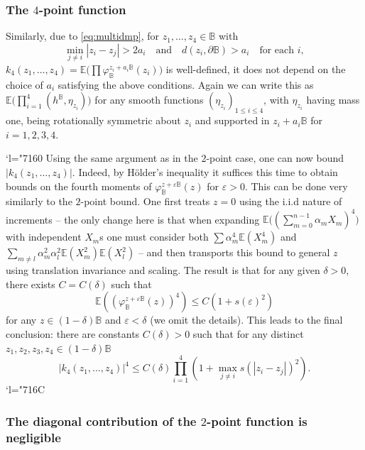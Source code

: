 \documentclass[10pt]{amsart}
\newcommand{\Changel}{\mathcode`l="7160}
\newcommand{\Changelback}{\mathcode`l="716C}
\theoremstyle{definition}
\newcommand{\E}{\mathbb{E}}
\newcommand{\B}{\mathbb{B}}\let\D\B\let\Ub\B
\let\eps\varepsilon
\begin{document}
\subsubsection*{The $4$-point function}
Similarly, due to \eqref{eq:multidmp}, for $z_1,\dots, z_4\in \B$ with
\[
\min_{j\ne i}{|z_i-z_j|}>2a_i\quad\text{and}\quad d(z_i,\partial \B)>a_i\quad\text{for each $i$},
\]
$k_4(z_1,\dots, z_4)=\E\bigl(\prod \varphi_\B^{z_i+a_i\B}(z_i)\bigr)$ is well-defined, \ie it does not depend on the choice of $a_i$ satisfying the above conditions. Again we can write this as $\E\bigl(\prod_{i=1}^4(h^\B,\eta_{z_i})\bigr)$ for any smooth functions $(\eta_{z_i})_{1\le i \le 4}$, with $\eta_{z_i}$ having mass one, being rotationally symmetric about $z_i$ and supported in $z_i+a_i\B$ for $i=1,2,3,4$.

\Changel
Using the same argument as in the $2$-point case, one can now bound $|k_4(z_1, \dots, z_4)|$. Indeed, by Hölder's inequality it suffices this time to obtain bounds on the fourth moments of $\varphi_\B^{z+\eps\B}(z)$ for $\eps>0$. This can be done very similarly to the $2$-point bound. One first treats $z = 0$ using the i.i.d nature of increments -- the only change here is that when expanding $\E\bigl((\sum_{m=0}^{n-1} \alpha_m X_m)^4\bigr)$ with independent $X_m$s one must consider both $\sum \alpha_m^4 \E(X_m^4)$ and $\sum_{m\ne l} \alpha_m^2\alpha_l^2 \E(X_m^2)\E(X_l^2)$ -- and then transports this bound to general $z$ using translation invariance and scaling. The result is that for any given $\delta>0$, there exists $C=C(\delta)$ such that
\begin{equation}\label{eq:circlebound2}
\mathbb{E}((\varphi_\B^{z+\eps\B}(z))^4)\le C(1+s(\eps)^2)\end{equation} for any $z\in (1-\delta)\B$ and $\eps<\delta$ (we omit the details). This leads to the final conclusion: there are constants $C(\delta)>0$ such that for any distinct $z_1,z_2,z_3,z_4\in (1-\delta)\B$
\begin{equation}\label{eq:moment_bounds} |k_4(z_1,\dots, z_4)|^4\leq C(\delta)\prod_{i=1}^4 (1+\max_{j\ne i} s(|z_i-z_j|)^2).
\end{equation}
\Changelback

\subsubsection*{The diagonal contribution of the $2$-point function is negligible}
\end{document}
